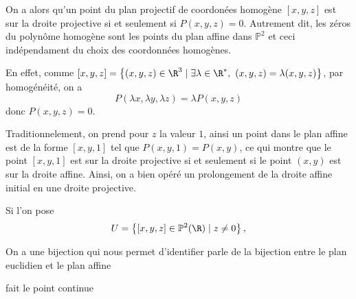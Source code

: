 On a alors qu'un point du plan projectif de coordonées homogène $\left[ x,y,z \right] $ est sur
la droite projective si et seulement si $P(x,y,z) = 0$. Autrement dit, les zéros du polynôme
homogène sont les points du plan affine dans $\mathbb{P}^2$ et ceci indépendament du choix des
coordonnées homogènes. 

En effet, comme $\left[ x,y,z \right] = \left\{ (x,y,z) \in
\R^3 \mid \exists \lambda \in \R^{*},\ (x,y,z) = \lambda(x,y,z) \right\}$, par homogénéité, on
a
\[
P(\lambda x, \lambda y, \lambda z) = \lambda P(x,y,z) 
\] 
donc $P(x,y,z)=0$.

Traditionnelement, on prend pour $z$ la valeur $1$, ainsi un point dans le plan affine est de
la forme $\left[ x,y,1 \right] $ tel que $P(x,y,1)=P(x,y)$, ce qui montre que le point $\left[
x,y,1\right] $ est sur la droite projective si et seulement si le point $(x,y)$ est sur la
droite affine. Ainsi, on a bien opéré un prolongement de la droite affine initial en une droite
projective.

Si l'on pose 
\[
U = \left\{ [x,y,z] \in \mathbb{P}^2(\R) \mid z \neq 0 \right\} 
,\] 

On a une bijection qui nous permet d'identifier
parle de la bijection entre le plan euclidien et le plan affine

fait le point continue
